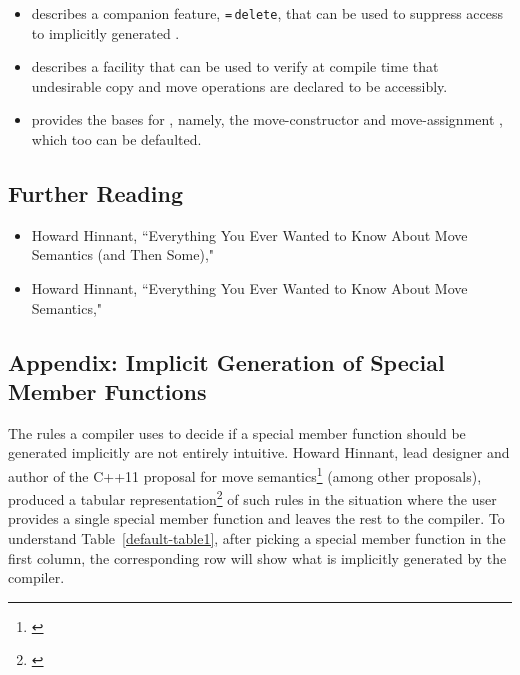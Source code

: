 {\begin{itemize}
\item{describes a companion feature, \lstinline!=!\,\lstinline!delete!, that can be used to suppress access to implicitly generated .}
\item{describes a facility that can be used to verify at compile time that undesirable copy and move operations are declared to be accessibly.}
\item{provides the bases for , namely, the move-constructor and move-assignment , which too can be defaulted.}
\end{itemize}

\subsection[Further Reading]{Further Reading}\label{further-reading}

\begin{itemize}
\item{Howard Hinnant, ``Everything You Ever Wanted to Know About Move Semantics (and Then Some)," \cite{hinnant14}}
\item{Howard Hinnant, ``Everything You Ever Wanted to Know About Move Semantics," \cite{hinnant16}}
\end{itemize}

\subsection[Appendix: Implicit Generation of Special Member Functions]{Appendix: Implicit Generation of Special Member Functions}\label{appendix:-implicit-generation-of-special-member-functions}

The rules a compiler uses to decide if a special member function
should be generated implicitly are not entirely intuitive. Howard
Hinnant, lead designer and author of the C++11 proposal for move
semantics\footnote{\cite{hinnant02}} (among other proposals), produced a tabular representation\footnote{\cite{hinnant16}} of
such rules in the situation where the user provides a single special
member function and leaves the rest to the compiler. To understand Table~\ref{default-table1}, after picking a special member function in the first
column, the corresponding row will show what is implicitly generated by
the compiler.

}
